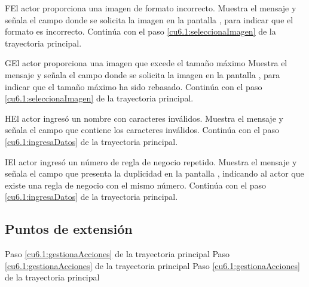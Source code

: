  \begin{UCtrayectoriaA}{F}{El actor proporciona una imagen de formato incorrecto.}
    \UCpaso[\UCsist] Muestra el mensaje  y señala el campo donde se solicita la imagen
    en la pantalla , para indicar que el formato es incorrecto.
    \UCpaso[] Continúa con el paso \ref{cu6.1:seleccionaImagen} de la trayectoria principal.
 \end{UCtrayectoriaA}
 
 \begin{UCtrayectoriaA}{G}{El actor proporciona una imagen que excede el tamaño máximo}
    \UCpaso[\UCsist] Muestra el mensaje  y señala el campo donde se solicita la imagen
    en la pantalla , para indicar que el tamaño máximo ha sido rebasado.
    \UCpaso[] Continúa con el paso \ref{cu6.1:seleccionaImagen} de la trayectoria principal.
 \end{UCtrayectoriaA}
 
 \begin{UCtrayectoriaA}{H}{El actor ingresó un nombre con caracteres inválidos.}
    \UCpaso[\UCsist] Muestra el mensaje  y señala el campo que contiene los caracteres inválidos.
    \UCpaso[] Continúa con el paso \ref{cu6.1:ingresaDatos} de la trayectoria principal.
 \end{UCtrayectoriaA}
 \begin{UCtrayectoriaA}{I}{El actor ingresó un número de regla de negocio repetido.}
    \UCpaso[\UCsist] Muestra el mensaje  y señala el campo que presenta la duplicidad en la pantalla 
	    , indicando al actor que existe una regla de negocio con el mismo número.
    \UCpaso[] Continúa con el paso \ref{cu6.1:ingresaDatos} de la trayectoria principal.
 \end{UCtrayectoriaA}

\subsection{Puntos de extensión}

	{Paso \ref{cu6.1:gestionaAcciones} de la trayectoria principal}
	{}
	{Paso \ref{cu6.1:gestionaAcciones} de la trayectoria principal}
	{}	
	{Paso \ref{cu6.1:gestionaAcciones} de la trayectoria principal}
	{}